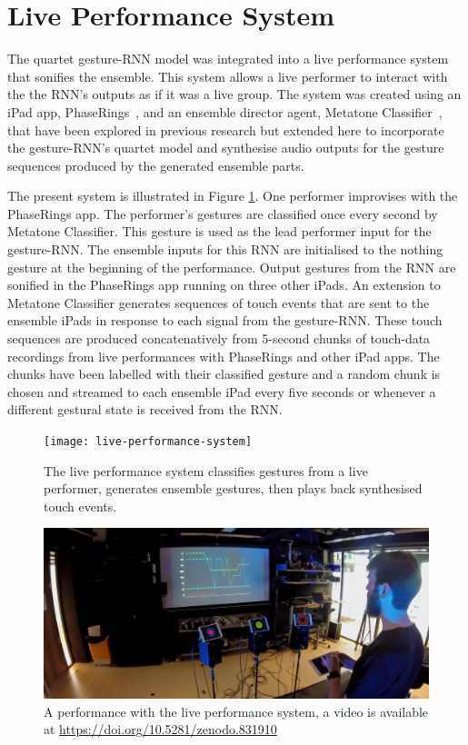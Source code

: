 \documentclass[sigchi]{acmart} %
\begin{document}
\section{Live Performance System}

The quartet gesture-RNN model was integrated into a live performance
system that sonifies the ensemble. This system allows a live performer
to interact with the the RNN's outputs as if it was a live group.
The system was created using an iPad app,
PhaseRings~\cite{Martin:2016ah}, and an ensemble director agent,
Metatone Classifier~\cite{Martin:2016xu}, that have been explored in
previous research but extended here to incorporate the gesture-RNN's
quartet model and synthesise audio outputs for the gesture sequences
produced by the generated ensemble parts.

The present system is illustrated in Figure
\ref{fig:live-performance-system}. One performer improvises with the
PhaseRings app. The performer's gestures are classified once every
second by Metatone Classifier. This gesture is used as the lead
performer input for the gesture-RNN. The ensemble inputs for this RNN
are initialised to the nothing gesture at the beginning of the
performance. Output gestures from the RNN are sonified in the
PhaseRings app running on three other iPads. An extension to Metatone
Classifier generates sequences of touch events that are sent to the
ensemble iPads in response to each signal from the gesture-RNN. These
touch sequences are produced concatenatively from 5-second chunks of
touch-data recordings from live performances with PhaseRings and other
iPad apps. The chunks have been labelled with their classified gesture
and a random chunk is chosen and streamed to each ensemble iPad every
five seconds or whenever a different gestural state is received from
the RNN.

\begin{figure}
  \centering
  \texttt{[image: live-performance-system]}
  \caption{The live performance system classifies gestures from a live
  performer, generates ensemble gestures, then plays back synthesised
  touch events.}\label{fig:live-performance-system}
\end{figure}

\begin{figure}
  \centering
  \includegraphics[width=\columnwidth]{neural-ipad-band-demo.jpg}
  \caption{A performance with the live performance system, a video is
    available at
    \url{https://doi.org/10.5281/zenodo.831910}}\label{fig:live-system-demo}
\end{figure}
\end{document}
